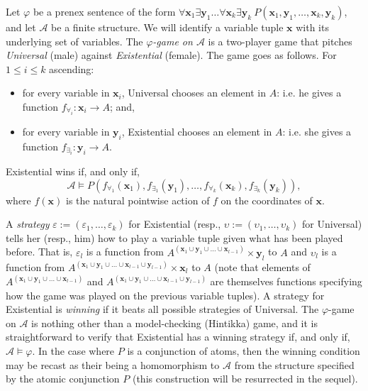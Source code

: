 \documentclass{LMCS}
\newcommand{\tuple}[1]{\ensuremath{\mathbf{#1}}}
\begin{document}
Let $\varphi$ be a prenex sentence of the form $\forall \tuple{x}_1 \exists \tuple{y}_1 \ldots \forall \tuple{x}_k \exists \tuple{y}_k \ P(\tuple{x}_1,\tuple{y}_1,\ldots,\tuple{x}_k,\tuple{y}_k)$, and let $\mathcal{A}$ be a finite structure. We will identify a variable tuple $\tuple{x}$ with its underlying set of variables. The \emph{$\varphi$-game on $\mathcal{A}$} is a two-player game that pitches
\emph{Universal} (male) against \emph{Existential} (female). 
The game goes as follows.
For $1 \leq i \leq k$ ascending: 
\begin{itemize}
\item for every variable in $\tuple{x}_i$, Universal chooses an element in
  $A$: i.e. he gives a function $f_{\forall_i}:\tuple{x}_i\rightarrow A$;
  and, 
\item for every variable in $\tuple{y}_i$, Existential chooses an element in
  $A$: i.e. she gives a function $f_{\exists_i}:\tuple{y}_i \rightarrow A$.
\end{itemize}
Existential wins if, and only if, 
\[ \mathcal{A} \models P(f_{\forall_1}(\tuple{x}_1),f_{\exists_1}(\tuple{y}_1),\ldots,f_{\forall_k}(\tuple{x}_k),f_{\exists_k}(\tuple{y}_k)), \]
where $f(\tuple{x})$ is the natural pointwise action of $f$ on the coordinates of $\tuple{x}$. 


A \emph{strategy} $\varepsilon:=(\varepsilon_1, \ldots,\varepsilon_k)$ for Existential (resp., $\upsilon:=(\upsilon_1,\ldots,\upsilon_{k})$ for Universal) tells
her (resp., him) how to play a variable tuple given what has been played
before. That is, $\varepsilon_l$ is a function from 
$A^{(\tuple{x}_1 \cup \tuple{y}_1 \cup \ldots \cup \tuple{x}_{l-1})} \times \tuple{y}_l$
to $A$ and $\upsilon_l$ is a function from 
$A^{(\tuple{x}_1 \cup \tuple{y}_1 \cup \ldots \cup \tuple{x}_{l-1} \cup \tuple{y}_{l-1})} \times \tuple{x}_l$
to $A$ (note that elements of $A^{(\tuple{x}_1 \cup \tuple{y}_1 \cup \ldots \cup \tuple{x}_{l-1})}$ and $A^{(\tuple{x}_1 \cup \tuple{y}_1 \cup \ldots \cup \tuple{x}_{l-1} \cup \tuple{y}_{l-1})}$ are themselves functions specifying how the game was played on the previous variable tuples). 
A strategy for Existential is \emph{winning} if it beats all possible strategies of Universal. The $\varphi$-game on $\mathcal{A}$ is nothing other than a model-checking (Hintikka) game, and it is straightforward to verify that Existential has a winning strategy if, and only if, $\mathcal{A} \models \varphi$. In the case where $P$ is a conjunction of atoms, then the winning condition may be recast as their being a homomorphism to $\mathcal{A}$ from the structure specified by the atomic conjunction $P$ (this construction will be resurrected in the sequel). 
\end{document}
